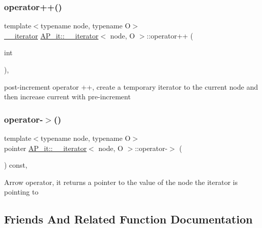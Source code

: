 \subsubsection{\texorpdfstring{operator++()}{operator++()}\hspace{0.1cm}{\footnotesize\ttfamily [2/2]}}
{\footnotesize\ttfamily template$<$typename node, typename O$>$ \\
\hyperlink{classAP__it_1_1____iterator}{\+\_\+\+\_\+iterator} \hyperlink{classAP__it_1_1____iterator}{A\+P\+\_\+it\+::\+\_\+\+\_\+iterator}$<$ node, O $>$\+::operator++ (\begin{DoxyParamCaption}\item[{int}]{ }\end{DoxyParamCaption})\hspace{0.3cm}{\ttfamily [inline]}, {\ttfamily [noexcept]}}

post-\/increment operator ++, create a temporary iterator to the current node and then increase current with pre-\/increment \mbox{\label{classAP__it_1_1____iterator_ad592364949f9c5ff5173f39d31f0eb11}} 
\subsubsection{\texorpdfstring{operator-\/$>$()}{operator->()}}
{\footnotesize\ttfamily template$<$typename node, typename O$>$ \\
pointer \hyperlink{classAP__it_1_1____iterator}{A\+P\+\_\+it\+::\+\_\+\+\_\+iterator}$<$ node, O $>$\+::operator-\/$>$ (\begin{DoxyParamCaption}{ }\end{DoxyParamCaption}) const\hspace{0.3cm}{\ttfamily [inline]}, {\ttfamily [noexcept]}}

Arrow operator, it returns a pointer to the value of the node the iterator is pointing to 

\subsection{Friends And Related Function Documentation}
\mbox{\label{classAP__it_1_1____iterator_add0144e7693bde5e4b509b5fd8dc5c96}} 
